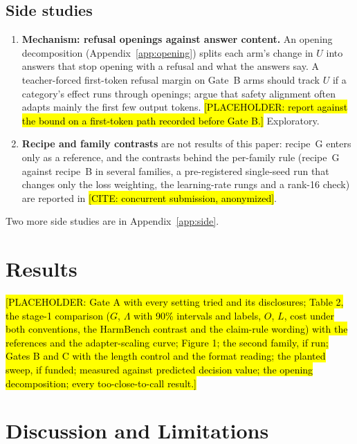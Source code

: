 \documentclass{article}
\theoremstyle{plain}
\theoremstyle{definition}
\theoremstyle{remark}
\newcommand{\ph}[1]{\hl{#1}}
\begin{document}
\subsection{Side studies}
\label{sec:side}

\begin{enumerate}
  \item \textbf{Mechanism: refusal openings against answer content.} An
        opening decomposition (Appendix~\ref{app:opening}) splits each arm's
        change in $U$ into answers that stop opening with a refusal and what
        the answers say. A teacher-forced first-token refusal margin on
        Gate~B arms should track $U$ if a category's effect runs through
        openings; \citet{qi2025shallow} argue that safety alignment often
        adapts mainly the first few output tokens. \ph{[PLACEHOLDER: report
        against the bound on a first-token path recorded before Gate B.]}
        Exploratory.
  \item \textbf{Recipe and family contrasts} are not results of this paper:
        recipe~G enters only as a reference, and the contrasts behind the
        per-family rule (recipe~G against recipe~B in several families, a
        pre-registered
        single-seed run that changes only the loss weighting, the
        learning-rate rungs and a rank-16 check) are reported in \ph{[CITE: concurrent submission, anonymized]}.
\end{enumerate}
Two more side studies are in Appendix~\ref{app:side}.

\section{Results}
\label{sec:results}

\ph{[PLACEHOLDER: Gate A with every setting tried and its disclosures;
Table 2, the stage-1 comparison ($G$, $\Lambda$ with 90\% intervals and labels,
$O$, $L$, cost under both conventions, the HarmBench contrast and the
claim-rule wording) with the references and the adapter-scaling curve;
Figure 1; the second family, if run; Gates B and C with the length control and
the format reading; the planted sweep, if funded; measured against predicted
decision value; the opening decomposition; every too-close-to-call result.]}

\section{Discussion and Limitations}
\label{sec:discussion}
\end{document}
